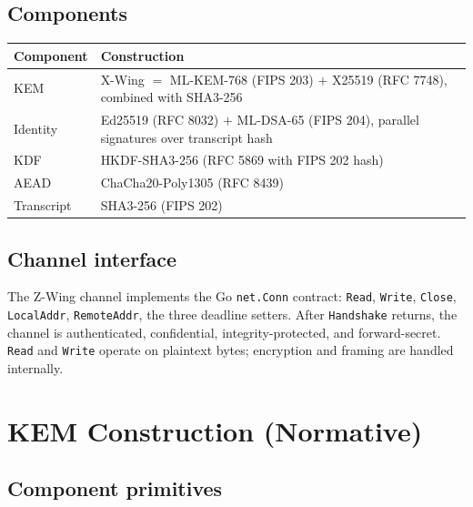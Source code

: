 \documentclass[11pt,a4paper]{article}
\begin{document}
\subsection{Components}

\begin{table}[H]
\centering
\begin{tabularx}{\textwidth}{lX}
\toprule
\textbf{Component} & \textbf{Construction} \\
\midrule
KEM        & X-Wing $=$ ML-KEM-768 (FIPS 203) $+$ X25519 (RFC 7748), combined with SHA3-256 \\
Identity   & Ed25519 (RFC 8032) $+$ ML-DSA-65 (FIPS 204), parallel signatures over transcript hash \\
KDF        & HKDF-SHA3-256 (RFC 5869 with FIPS 202 hash) \\
AEAD       & ChaCha20-Poly1305 (RFC 8439) \\
Transcript & SHA3-256 (FIPS 202) \\
\bottomrule
\end{tabularx}
\end{table}

\subsection{Channel interface}

The Z-Wing channel implements the Go \texttt{net.Conn} contract: \texttt{Read},
\texttt{Write}, \texttt{Close}, \texttt{LocalAddr}, \texttt{RemoteAddr}, the
three deadline setters. After \texttt{Handshake} returns, the channel is
authenticated, confidential, integrity-protected, and forward-secret.
\texttt{Read} and \texttt{Write} operate on plaintext bytes; encryption and
framing are handled internally.

\section{KEM Construction (Normative)}

\subsection{Component primitives}
\end{document}
